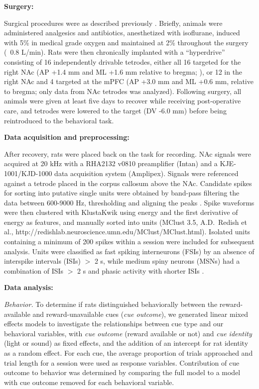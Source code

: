 \documentclass[11pt]{article}
\let\cite=\citep
\let\citeNP=\citealt
\begin{document}
{\bf Surgery:}

Surgical procedures were as described previously
\cite{Malhotra2015}. Briefly, animals were administered analgesics and
antibiotics, anesthetized with isoflurane, induced with 5\% in medical
grade oxygen and maintained at 2\% throughout the surgery (~0.8
L/min). Rats were then chronically implanted with a ``hyperdrive''
consisting of 16 independently drivable tetrodes, either all 16
targeted for the right NAc (AP +1.4 mm and ML +1.6 mm relative to
bregma; \citeNP{atlas}), or 12 in the right NAc and 4 targeted at the
mPFC (AP +3.0 mm and ML +0.6 mm, relative to bregma; only data from
NAc tetrodes was analyzed). Following surgery, all animals were given
at least five days to recover while receiving post-operative care, and
tetrodes were lowered to the target (DV -6.0 mm) before being
reintroduced to the behavioral task.

{\bf Data acquisition and preprocessing:}

After recovery, rats were placed back on the task for recording. NAc
signals were acquired at 20 kHz with a RHA2132 v0810 preamplifier
(Intan) and a KJE-1001/KJD-1000 data acquisition system
(Amplipex). Signals were referenced against a tetrode placed in the
corpus callosum above the NAc. Candidate spikes for sorting into
putative single units were obtained by band-pass filtering the data
between 600-9000 Hz, thresholding and aligning the peaks \cite[UltraMegaSort2k, ][]{Hill2011}. Spike waveforms were then
clustered with KlustaKwik using energy and the first derivative of
energy as features, and manually sorted into units (MClust 3.5,
A.D.\ Redish et al., http://redishlab.neuroscience.umn.edu/MClust/MClust.html). Isolated units containing a minimum of 200
spikes within a session were included for subsequent analysis. Units
were classified as fast spiking interneurons (FSIs) by an absence of
interspike intervals (ISIs) $>$ 2 s, while medium spiny neurons (MSNs)
had a combination of ISIs $>$ 2 s and phasic activity with shorter
ISIs \cite{Barnes2005,Atallah2014}.

{\bf Data analysis:}

{\it Behavior.} To determine if rats distinguished behaviorally
between the reward-available and reward-unavailable cues ({\it cue
outcome}), we generated linear mixed effects models to investigate
the relationships between cue type and our behavioral variables, with
{\it cue outcome} (reward available or not) and {\it cue identity}
(light or sound) as fixed effects, and the addition of an intercept
for rat identity as a random effect. For each cue, the average
proportion of trials approached and trial length for a session were
used as response variables. Contribution of cue outcome to behavior
was determined by comparing the full model to a model with cue outcome
removed for each behavioral variable.
\end{document}
